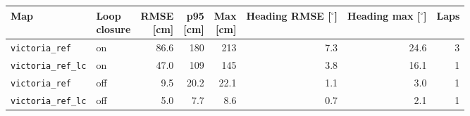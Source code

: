 \begin{tabular}{llrrrrrr}
\toprule
Map & \makecell[lb]{{Loop} \\ {closure}} & \makecell[rb]{{RMSE} \\ {[cm]}} & \makecell[rb]{{p95} \\ {[cm]}} & \makecell[rb]{{Max} \\ {[cm]}} & \makecell[rb]{{Heading} \\ {RMSE [$^\circ$]}} & \makecell[rb]{{Heading} \\ {max [$^\circ$]}} & Laps \\
\midrule
\texttt{victoria\_ref} & on & 86.6 & 180 & 213 & 7.3 & 24.6 & 3 \\
\texttt{victoria\_ref\_lc} & on & 47.0 & 109 & 145 & 3.8 & 16.1 & 1 \\
\texttt{victoria\_ref} & off & 9.5 & 20.2 & 22.1 & 1.1 & 3.0 & 1 \\
\texttt{victoria\_ref\_lc} & off & 5.0 & 7.7 & 8.6 & 0.7 & 2.1 & 1 \\
\bottomrule
\end{tabular}
